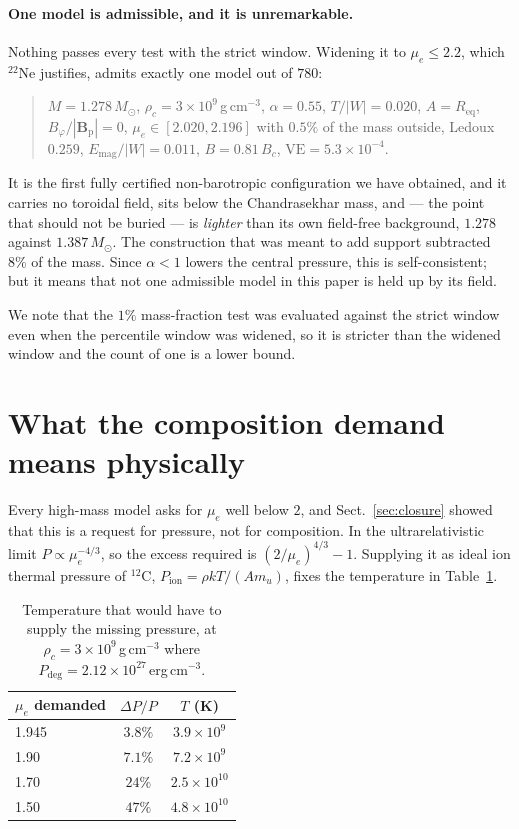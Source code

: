 \documentclass{aa}
\begin{document}
\paragraph{One model is admissible, and it is unremarkable.} Nothing
passes every test with the strict window. Widening it to
$\mu_e \le 2.2$, which $^{22}$Ne justifies, admits exactly one model out
of $780$:
\begin{quote}
$M = 1.278\,M_\odot$, $\rho_c = 3\times10^9$\,g\,cm$^{-3}$,
$\alpha = 0.55$, $T/|W| = 0.020$, $A = R_{\mathrm{eq}}$,
$B_\varphi/|\mathbf{B}_{\mathrm{p}}| = 0$,
$\mu_e \in [2.020, 2.196]$ with $0.5\%$ of the mass outside,
Ledoux $0.259$, $E_{\mathrm{mag}}/|W| = 0.011$, $B = 0.81\,B_c$,
$\mathrm{VE} = 5.3\times10^{-4}$.
\end{quote}
It is the first fully certified non-barotropic configuration we have
obtained, and it carries no toroidal field, sits below the Chandrasekhar
mass, and --- the point that should not be buried --- is \emph{lighter}
than its own field-free background, $1.278$ against $1.387\,M_\odot$.
The construction that was meant to add support subtracted $8\%$ of the
mass. Since $\alpha < 1$ lowers the central pressure, this is
self-consistent; but it means that not one admissible model in this
paper is held up by its field.

We note that the $1\%$ mass-fraction test was evaluated against the
strict window even when the percentile window was widened, so it is
stricter than the widened window and the count of one is a lower bound.


\section{What the composition demand means physically}
\label{sec:thermal}

Every high-mass model asks for $\mu_e$ well below $2$, and
Sect.~\ref{sec:closure} showed that this is a request for pressure, not
for composition. In the ultrarelativistic limit $P \propto
\mu_e^{-4/3}$, so the excess required is
$(2/\mu_e)^{4/3} - 1$. Supplying it as ideal ion thermal pressure of
$^{12}$C, $P_{\mathrm{ion}} = \rho k T / (A m_u)$, fixes the temperature
in Table~\ref{tab:temp}.

\begin{table}
\caption{Temperature that would have to supply the missing pressure, at
         $\rho_c = 3\times10^9$\,g\,cm$^{-3}$ where
         $P_{\mathrm{deg}} = 2.12\times10^{27}$\,erg\,cm$^{-3}$.}
\label{tab:temp}
\centering
\begin{tabular}{lcc}
\hline\hline
$\mu_e$ demanded & $\Delta P / P$ & $T$ (K) \\
\hline
1.945 & $3.8\%$  & $3.9\times10^{9}$ \\
1.90  & $7.1\%$  & $7.2\times10^{9}$ \\
1.70  & $24\%$   & $2.5\times10^{10}$ \\
1.50  & $47\%$   & $4.8\times10^{10}$ \\
\hline
\end{tabular}
\end{table}
\end{document}
